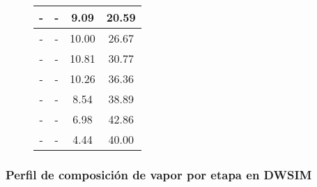 \begin{figure}[H]
\begin{tabular}{|c|c|c|c|}
        -              & -                & 9.09              & 20.59              \\
        \hline
        -              & -                & 10.00             & 26.67              \\
        \hline
        -              & -                & 10.81             & 30.77              \\
        \hline
        -              & -                & 10.26             & 36.36              \\
        \hline
        -              & -                & 8.54              & 38.89              \\
        \hline
        -              & -                & 6.98              & 42.86              \\
        \hline
        -              & -                & 4.44              & 40.00              \\
        \hline
    \end{tabular}
    \normalsize
\end{figure}

\newpage

\subsubsection{Perfil de composición de vapor por etapa en DWSIM}

